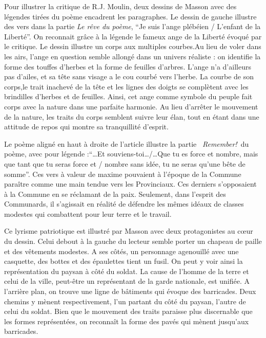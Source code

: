 Pour illustrer la critique de R.J. Moulin, deux dessins de Masson avec des légendes tirées du poème encadrent les paragraphes.  Le dessin de gauche illustre des vers dans la partie \emph{Le rêve du poème}, \enquote{Je suis l’ange plébéien / L’enfant de la Liberté}. On reconnait grâce à la légende le fameux ange de la Liberté évoqué par le critique. Le dessin illustre un corps aux multiples courbes.Au lieu de voler dans les airs, l’ange en question semble allongé dans un univers réaliste : on identifie la forme des touffes d’herbes et la forme de feuilles d’arbres. L’ange n’a d’ailleurs pas d’ailes, et sa tête sans visage a le cou courbé vers l’herbe. La courbe de son corps,le trait inachevé de la tête et les lignes des doigts se complètent avec les brindilles d’herbes et de feuilles. Ainsi, cet ange comme symbole du peuple fait corps avec la nature dans une parfaite harmonie. Au lieu d’arrêter le mouvement de la nature, les traits du corps semblent suivre leur élan, tout en étant dans une attitude de repos qui montre sa tranquillité d’esprit.


Le poème aligné en haut à droite de l’article illustre la partie  \emph{Remember!} du poème, avec pour légende :\enquote{…Et souviens-toi…/…Que tu es force et nombre, mais que tant que tu seras force et / nombre sans idée, tu ne seras qu’une bête de somme}. Ces vers à valeur de maxime pouvaient à l’époque de la Commune paraître comme une main tendue vers les Provinciaux. Ces derniers s’opposaient à la Commune en se réclamant de la paix. Seulement, dans l’esprit des Communards, il s’agissait en réalité de défendre les mêmes idéaux de classes modestes qui combattent pour leur terre et le travail.

Ce lyrisme patriotique est illustré par Masson avec deux protagonistes au c\oe{}ur du dessin. Celui debout à la gauche du lecteur semble porter un chapeau de paille et des vêtements modestes. A ses côtés, un personnage agenouillé avec une casquette, des bottes et des épaulettes tient un fusil. On peut y voir ainsi la représentation du paysan à côté du soldat. La cause de l’homme de la terre et celui de la ville, peut-être un représentant de la garde nationale, est unifiée. A l’arrière plan, on trouve une ligne de bâtiments qui évoque des barricades. Deux chemins y mènent respectivement, l’un partant du côté du paysan, l’autre de celui du soldat. Bien que le mouvement des traits paraisse plus discernable que les formes représentées, on reconnaît la forme des pavés qui mènent jusqu’aux barricades.

